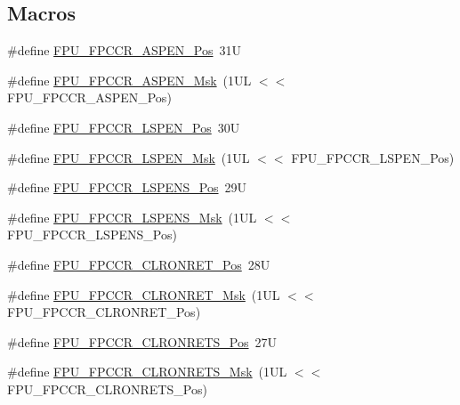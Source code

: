 \subsection*{Macros}
\begin{DoxyCompactItemize}
\item 
\#define \hyperlink{group___c_m_s_i_s___f_p_u_ga4228a923ddf665f868e56b4b9e9bff7b}{F\+P\+U\+\_\+\+F\+P\+C\+C\+R\+\_\+\+A\+S\+P\+E\+N\+\_\+\+Pos}~31U
\item 
\#define \hyperlink{group___c_m_s_i_s___f_p_u_ga309886ff6bbd25cb13c061c6683c6c0c}{F\+P\+U\+\_\+\+F\+P\+C\+C\+R\+\_\+\+A\+S\+P\+E\+N\+\_\+\+Msk}~(1\+U\+L $<$$<$ F\+P\+U\+\_\+\+F\+P\+C\+C\+R\+\_\+\+A\+S\+P\+E\+N\+\_\+\+Pos)
\item 
\#define \hyperlink{group___c_m_s_i_s___f_p_u_gac7d70e051fe759ad8fed83bf5b5aebc1}{F\+P\+U\+\_\+\+F\+P\+C\+C\+R\+\_\+\+L\+S\+P\+E\+N\+\_\+\+Pos}~30U
\item 
\#define \hyperlink{group___c_m_s_i_s___f_p_u_gaf4ab19de45df6522dd882bc116f938e9}{F\+P\+U\+\_\+\+F\+P\+C\+C\+R\+\_\+\+L\+S\+P\+E\+N\+\_\+\+Msk}~(1\+U\+L $<$$<$ F\+P\+U\+\_\+\+F\+P\+C\+C\+R\+\_\+\+L\+S\+P\+E\+N\+\_\+\+Pos)
\item 
\#define \hyperlink{group___c_m_s_i_s___f_p_u_ga705368bf3c52b5bb4edfbcb3e2631e1c}{F\+P\+U\+\_\+\+F\+P\+C\+C\+R\+\_\+\+L\+S\+P\+E\+N\+S\+\_\+\+Pos}~29U
\item 
\#define \hyperlink{group___c_m_s_i_s___f_p_u_ga73afcf0fe09c69e9625e11035cabb1c0}{F\+P\+U\+\_\+\+F\+P\+C\+C\+R\+\_\+\+L\+S\+P\+E\+N\+S\+\_\+\+Msk}~(1\+U\+L $<$$<$ F\+P\+U\+\_\+\+F\+P\+C\+C\+R\+\_\+\+L\+S\+P\+E\+N\+S\+\_\+\+Pos)
\item 
\#define \hyperlink{group___c_m_s_i_s___f_p_u_ga0b97b2fdac794f4fddab1e4342e0c104}{F\+P\+U\+\_\+\+F\+P\+C\+C\+R\+\_\+\+C\+L\+R\+O\+N\+R\+E\+T\+\_\+\+Pos}~28U
\item 
\#define \hyperlink{group___c_m_s_i_s___f_p_u_gadedc12ec237657721a613c6f47abed6f}{F\+P\+U\+\_\+\+F\+P\+C\+C\+R\+\_\+\+C\+L\+R\+O\+N\+R\+E\+T\+\_\+\+Msk}~(1\+U\+L $<$$<$ F\+P\+U\+\_\+\+F\+P\+C\+C\+R\+\_\+\+C\+L\+R\+O\+N\+R\+E\+T\+\_\+\+Pos)
\item 
\#define \hyperlink{group___c_m_s_i_s___f_p_u_gabb18ccf9d1b0a4bef3b0823f18eb96ba}{F\+P\+U\+\_\+\+F\+P\+C\+C\+R\+\_\+\+C\+L\+R\+O\+N\+R\+E\+T\+S\+\_\+\+Pos}~27U
\item 
\#define \hyperlink{group___c_m_s_i_s___f_p_u_ga103d932807c15250d96711952878eeb2}{F\+P\+U\+\_\+\+F\+P\+C\+C\+R\+\_\+\+C\+L\+R\+O\+N\+R\+E\+T\+S\+\_\+\+Msk}~(1\+U\+L $<$$<$ F\+P\+U\+\_\+\+F\+P\+C\+C\+R\+\_\+\+C\+L\+R\+O\+N\+R\+E\+T\+S\+\_\+\+Pos)
$$
\end{DoxyCompactItemize}
